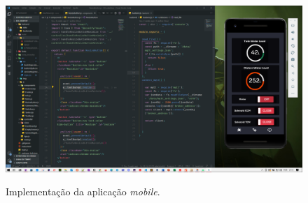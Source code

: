 \begin{figure}[H]
	\centering
	\caption{Implementação da aplicação \textit{mobile}.}
	\includegraphics[width=1\textwidth]{figuras/rcs_mobile.png}
	\label{fig:tela_mobile}
\end{figure}
